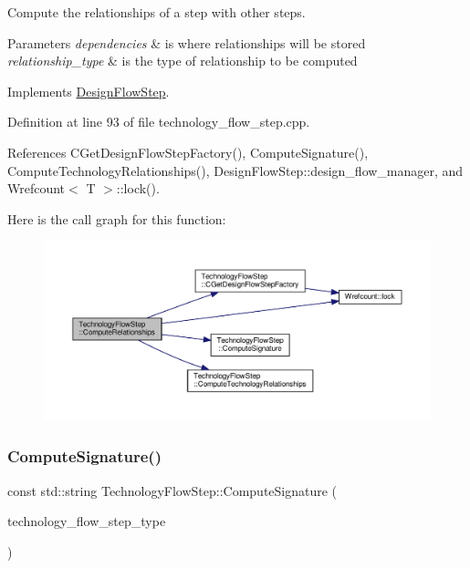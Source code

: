 Compute the relationships of a step with other steps. 


\begin{DoxyParams}{Parameters}
{\em dependencies} & is where relationships will be stored \\
\hline
{\em relationship\+\_\+type} & is the type of relationship to be computed \\
\hline
\end{DoxyParams}


Implements \hyperlink{classDesignFlowStep_a65bf7bcb603189a7ddcf930c3a9fd7fe}{Design\+Flow\+Step}.



Definition at line 93 of file technology\+\_\+flow\+\_\+step.\+cpp.



References C\+Get\+Design\+Flow\+Step\+Factory(), Compute\+Signature(), Compute\+Technology\+Relationships(), Design\+Flow\+Step\+::design\+\_\+flow\+\_\+manager, and Wrefcount$<$ T $>$\+::lock().

Here is the call graph for this function\+:
\nopagebreak
\begin{figure}[H]
\begin{center}
\leavevmode
\includegraphics[width=350pt]{d9/deb/classTechnologyFlowStep_a94c17619fd6b02de821d7e41ff454d85_cgraph}
\end{center}
\end{figure}
\mbox{\label{classTechnologyFlowStep_a404a56f6775e683963f57892e0bf7b0a}} 
\subsubsection{\texorpdfstring{Compute\+Signature()}{ComputeSignature()}}
{\footnotesize\ttfamily const std\+::string Technology\+Flow\+Step\+::\+Compute\+Signature (\begin{DoxyParamCaption}\item[{const \hyperlink{technology__flow__step_8hpp_a65208cfec963a7d7def292f9db428292}{Technology\+Flow\+Step\+\_\+\+Type}}]{technology\+\_\+flow\+\_\+step\+\_\+type }\end{DoxyParamCaption})\hspace{0.3cm}{\ttfamily [static]}}



